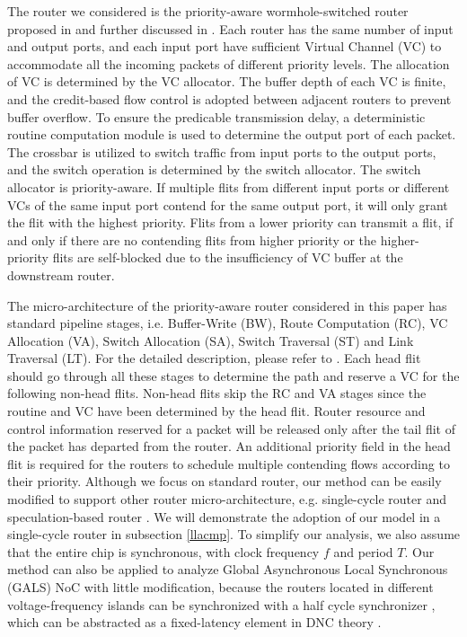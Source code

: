 \documentclass[preprint]{elsarticle}
\begin{document}
The router we considered is the priority-aware wormhole-switched router proposed in \cite{Shi:2008:RCA:1397757.1397996} and further discussed in \cite{627905}\cite{707545}\cite{73}. Each router has the same number of input and output ports, and each input port have sufficient Virtual Channel (VC) to accommodate all the incoming packets of different priority levels. The allocation of VC is determined by the VC allocator. The buffer depth of each VC is finite, and the credit-based flow control \cite{DaTo04} is adopted between adjacent routers to prevent buffer overflow. To ensure the predicable transmission delay, a deterministic routine computation module is used to determine the output port of each packet. The crossbar is utilized to switch traffic from input ports to the output ports, and the switch operation is determined by the switch allocator. The switch allocator is priority-aware. If multiple flits from different input ports or different VCs of the same input port contend for the same output port, it will only grant the flit with the highest priority. Flits from a lower priority can transmit a flit, if and only if there are no contending flits from higher priority or the higher-priority flits are self-blocked due to the insufficiency of VC buffer at the downstream router.

The micro-architecture of the priority-aware router considered in this paper has standard pipeline stages, i.e. Buffer-Write (BW), Route Computation (RC), VC Allocation (VA), Switch Allocation (SA), Switch Traversal (ST) and Link Traversal (LT). For the detailed description, please refer to \cite{jerger2009chip}. Each head flit should go through all these stages to determine the path and reserve a VC for the following non-head flits. Non-head flits skip the RC and VA stages since the routine and VC have been determined by the head flit. Router resource and control information reserved for a packet will be released only after the tail flit of the packet has departed from the router. An additional priority field in the head flit is required for the routers to schedule multiple contending flows according to their priority. Although we focus on standard router, our method can be easily modified to support other router micro-architecture, e.g. single-cycle router \cite{627905}\cite{Shi:2008:RCA:1397757.1397996}\cite{707545}\cite{73} and speculation-based router \cite{jerger2009chip}. We will demonstrate the adoption of our model in a single-cycle router in subsection \ref{llacmp}.  To simplify our analysis, we also assume that the entire chip is synchronous, with clock frequency $f$ and period $T$. Our method can also be applied to analyze Global Asynchronous Local Synchronous (GALS) NoC with little modification, because the routers located in different voltage-frequency islands can be synchronized with a half cycle synchronizer \cite{5476986}, which can be abstracted as a fixed-latency element in DNC theory \cite{Boudec2001Network}.
\end{document}
